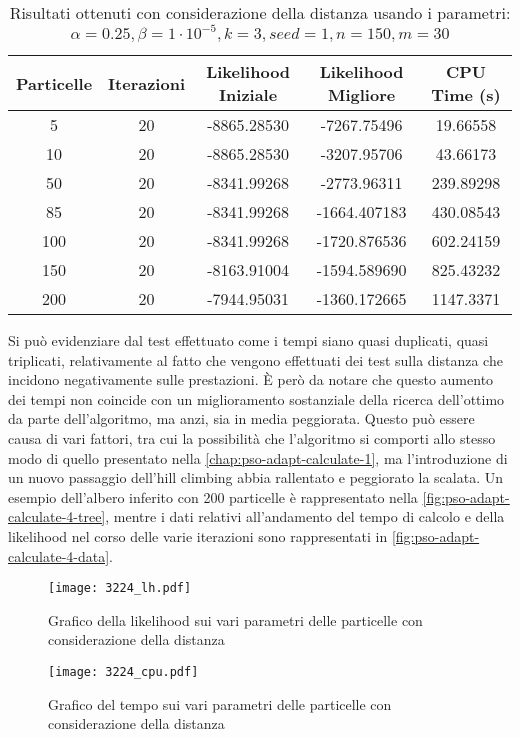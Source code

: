 \begin{table}[!h]
  \centering
  \begin{tabular}{*{5}{c}}
    Particelle & Iterazioni & Likelihood Iniziale & Likelihood Migliore & CPU Time (s) \\ \midrule \midrule
    5 & 20 & -8865.28530 & -7267.75496 & 19.66558 \\
    10 & 20 & -8865.28530 & -3207.95706 & 43.66173 \\
    50 & 20 & -8341.99268 & -2773.96311 & 239.89298 \\
    85 & 20 & -8341.99268 & -1664.407183 & 430.08543 \\
    100 & 20 & -8341.99268 & -1720.876536 & 602.24159 \\
    150 & 20 & -8163.91004 & -1594.589690 & 825.43232 \\
    200 & 20 & -7944.95031 & -1360.172665 & 1147.3371 \\
  \end{tabular}
  \caption{Risultati ottenuti con considerazione della distanza usando i parametri: $\alpha = 0.25, \beta = 1\cdot 10^{-5}, k = 3, seed = 1, n = 150, m = 30$}
  \label{tab:pso-adapt-calculate-4-table}
\end{table}

Si può evidenziare dal test effettuato come i tempi siano quasi duplicati, quasi triplicati, relativamente al fatto che vengono effettuati dei test sulla distanza che incidono negativamente sulle prestazioni. È però da notare che questo aumento dei tempi non coincide con un miglioramento sostanziale della ricerca dell'ottimo da parte dell'algoritmo, ma anzi, sia in media peggiorata. Questo può essere causa di vari fattori, tra cui la possibilità che l'algoritmo si comporti allo stesso modo di quello presentato nella \autoref{chap:pso-adapt-calculate-1}, ma l'introduzione di un nuovo passaggio dell'hill climbing abbia rallentato e peggiorato la scalata. Un esempio dell'albero inferito con 200 particelle è rappresentato nella \autoref{fig:pso-adapt-calculate-4-tree}, mentre i dati relativi all'andamento del tempo di calcolo e della likelihood nel corso delle varie iterazioni sono rappresentati in \autoref{fig:pso-adapt-calculate-4-data}.

\begin{figure}[!h]
  \centering
  \begin{minipage}{.45 \textwidth}
  \centering
  \texttt{[image: 3224\_lh.pdf]}
  \caption{Grafico della likelihood sui vari parametri delle particelle con considerazione della distanza}
  \end{minipage}
  \begin{minipage}{.45 \textwidth}
    \centering
    \texttt{[image: 3224\_cpu.pdf]}
    \caption{Grafico del tempo sui vari parametri delle particelle con considerazione della distanza}
  \end{minipage}
  \label{fig:pso-adapt-calculate-1-graph}
\end{figure}

